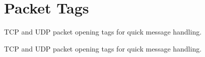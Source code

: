 \hypertarget{group__tags}{\section{Packet Tags}
\label{group__tags}
}


T\-C\-P and U\-D\-P packet opening tags for quick message handling.  


T\-C\-P and U\-D\-P packet opening tags for quick message handling. 